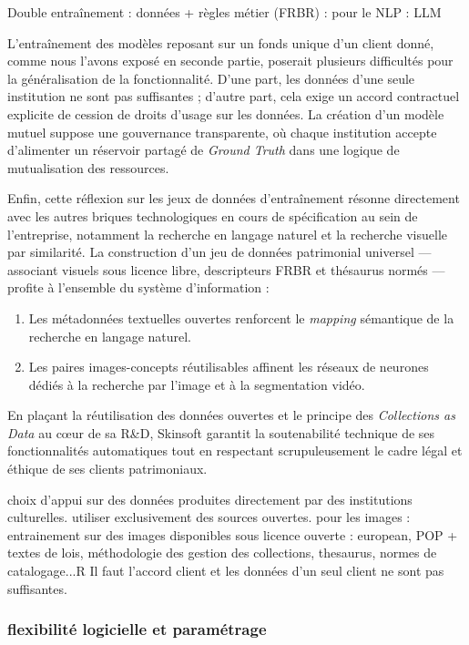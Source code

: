 Double entraînement : données + règles métier (FRBR) : pour le NLP : LLM

L'entraînement des modèles reposant sur un fonds unique d'un client donné, comme nous l'avons exposé en seconde partie, poserait plusieurs difficultés pour la généralisation de la fonctionnalité. D'une part, les données d'une seule institution ne sont pas suffisantes ; d'autre part, cela exige un accord contractuel explicite de cession de droits d'usage sur les données. La création d'un modèle mutuel suppose une gouvernance transparente, où chaque institution accepte d'alimenter un réservoir partagé de \textit{Ground Truth} dans une logique de mutualisation des ressources.

Enfin, cette réflexion sur les jeux de données d'entraînement résonne directement avec les autres briques technologiques en cours de spécification au sein de l'entreprise, notamment la recherche en langage naturel et la recherche visuelle par similarité. La construction d'un jeu de données patrimonial universel — associant visuels sous licence libre, descripteurs FRBR et thésaurus normés — profite à l'ensemble du système d'information :
\begin{enumerate}
	\item Les métadonnées textuelles ouvertes renforcent le \textit{mapping} sémantique de la recherche en langage naturel.
	\item Les paires images-concepts réutilisables affinent les réseaux de neurones dédiés à la recherche par l'image et à la segmentation vidéo.
\end{enumerate}

En plaçant la réutilisation des données ouvertes et le principe des \textit{Collections as Data} au cœur de sa R\&D, Skinsoft garantit la soutenabilité technique de ses fonctionnalités automatiques tout en respectant scrupuleusement le cadre légal et éthique de ses clients patrimoniaux.



choix d'appui sur des données produites directement par des institutions culturelles. utiliser exclusivement des sources ouvertes. pour les images : entrainement sur des images disponibles sous licence ouverte : european, POP + textes de lois, méthodologie des gestion des collections, thesaurus, normes de catalogage...R
Il faut l'accord client et les données d'un seul client ne sont pas suffisantes.



\subsubsection{flexibilité logicielle et paramétrage}

